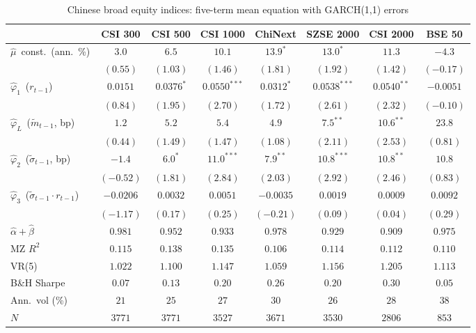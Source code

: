 \begin{table}[htbp]\centering
\caption{Chinese broad equity indices: five-term mean equation with GARCH(1,1) errors}\label{tab:ashare_en}
\footnotesize\setlength{\tabcolsep}{4pt}
\begin{threeparttable}
\begin{tabular}{lccccccc}
\toprule
 & CSI 300 & CSI 500 & CSI 1000 & ChiNext & SZSE 2000 & CSI 2000 & BSE 50 \\
\midrule
$\hat\mu$~const.\ (ann.\ \%) & $3.0$ & $6.5$ & $10.1$ & $13.9^{*}$ & $13.0^{*}$ & $11.3$ & $-4.3$ \\
 & $(0.55)$ & $(1.03)$ & $(1.46)$ & $(1.81)$ & $(1.92)$ & $(1.42)$ & $(-0.17)$ \\[2pt]
$\hat\varphi_1$~($r_{t-1}$) & $0.0151$ & $0.0376^{*}$ & $0.0550^{***}$ & $0.0312^{*}$ & $0.0538^{***}$ & $0.0540^{**}$ & $-0.0051$ \\
 & $(0.84)$ & $(1.95)$ & $(2.70)$ & $(1.72)$ & $(2.61)$ & $(2.32)$ & $(-0.10)$ \\[2pt]
$\hat\varphi_L$~($\tilde m_{t-1}$, bp) & $1.2$ & $5.2$ & $5.4$ & $4.9$ & $7.5^{**}$ & $10.6^{**}$ & $23.8$ \\
 & $(0.44)$ & $(1.49)$ & $(1.47)$ & $(1.08)$ & $(2.11)$ & $(2.53)$ & $(0.81)$ \\[2pt]
$\hat\varphi_2$~($\tilde\sigma_{t-1}$, bp) & $-1.4$ & $6.0^{*}$ & $11.0^{***}$ & $7.9^{**}$ & $10.8^{***}$ & $10.8^{**}$ & $10.8$ \\
 & $(-0.52)$ & $(1.81)$ & $(2.84)$ & $(2.03)$ & $(2.92)$ & $(2.46)$ & $(0.83)$ \\[2pt]
$\hat\varphi_3$~($\tilde\sigma_{t-1}\!\cdot\! r_{t-1}$) & $-0.0206$ & $0.0032$ & $0.0051$ & $-0.0035$ & $0.0019$ & $0.0009$ & $0.0092$ \\
 & $(-1.17)$ & $(0.17)$ & $(0.25)$ & $(-0.21)$ & $(0.09)$ & $(0.04)$ & $(0.29)$ \\[2pt]
\midrule
$\hat\alpha+\hat\beta$ & $0.981$ & $0.952$ & $0.933$ & $0.978$ & $0.929$ & $0.909$ & $0.975$ \\
MZ $R^2$ & $0.115$ & $0.138$ & $0.135$ & $0.106$ & $0.114$ & $0.112$ & $0.110$ \\
VR(5) & $1.022$ & $1.100$ & $1.147$ & $1.059$ & $1.156$ & $1.205$ & $1.113$ \\
B\&H Sharpe & $0.07$ & $0.13$ & $0.20$ & $0.26$ & $0.20$ & $0.30$ & $0.05$ \\
Ann.\ vol (\%) & $21$ & $25$ & $27$ & $30$ & $26$ & $28$ & $38$ \\
$N$ & $3771$ & $3771$ & $3527$ & $3671$ & $3530$ & $2806$ & $853$ \\

\end{tabular}
\end{threeparttable}
\end{table}
